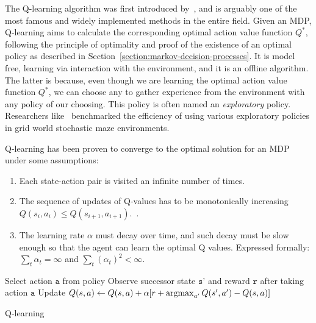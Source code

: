 \documentclass{../main.tex}{subfiles}
\newcommand{\var}{\texttt}
\begin{document}
The Q-learning algorithm was first introduced by~\cite{Watkins1989}, and is arguably one of the most famous and widely implemented methods in the entire field. Given an MDP, Q-learning aims to calculate the corresponding optimal action value function $Q^*$, following the principle of optimality and proof of the existence of an optimal policy as described in Section~\ref{section:markov-decision-processes}. It is model free, learning via interaction with the environment, and it is an offline algorithm. The latter is because, even though we are learning the optimal action value function $Q^*$, we can choose any to gather experience from the environment with any policy of our choosing. This policy is often named an \textit{exploratory} policy. Researchers like~\cite{Tijsma2017} benchmarked the efficiency of using various exploratory policies in grid world stochastic maze environments.

Q-learning has been proven to converge to the optimal solution for an MDP under some assumptions:
\begin{enumerate}
\item Each state-action pair is visited an infinite number of times.~\citep{Watkins1989}
\item The sequence of updates of Q-values has to be monotonically increasing  $Q(s_i, a_i) \leq Q(s_{i+1}, a_{i+1})$.~\citep{Thrun1993}.
\item The learning rate $\alpha$  must decay over time, and such decay must be slow enough so that the agent can learn the optimal Q values. Expressed formally: $\sum_{t} \alpha_t = \infty$ and $\sum_{t} {(\alpha_{t})}^{2} < \infty$.~\citep{Watkins1989}
\end{enumerate}
  
\begin{algorithm}
 {
    Select action $\var{a}$ from policy \;
    Observe successor state $\var{s'}$ and reward $\var{r}$ after taking action $\var{a}$ \;
    Update $Q(s,a) \leftarrow Q(s,a) + \alpha[r + \operatorname*{argmax}_{a'} Q(s', a') - Q(s,a)]$ \;

}
\caption{Q-learning}
\end{algorithm}

\end{document}
